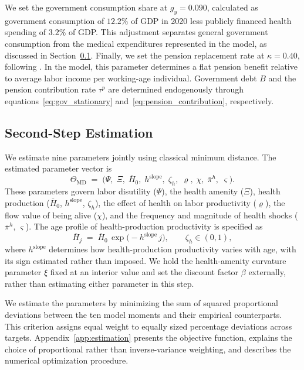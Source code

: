 \documentclass[12pt,a4paper]{article}
\begin{document}
We set the government consumption share at $g_y=0.090$, calculated as government consumption of $12.2\%$ of GDP in 2020 less publicly financed health spending of $3.2\%$ of GDP. This adjustment separates general government consumption from the medical expenditures represented in the model, as discussed in Section~\ref{subsec:secondstep_smm}. Finally, we set the pension replacement rate at $\kappa=0.40$, following \citet{Bonthuis2024}. In the model, this parameter determines a flat pension benefit relative to average labor income per working-age individual. Government debt $B$ and the pension contribution rate $\tau^p$ are determined endogenously through equations~\eqref{eq:gov_stationary} and~\eqref{eq:pension_contribution}, respectively.


\subsection{Second-Step Estimation}
\label{subsec:secondstep_smm}

We estimate nine parameters jointly using classical minimum distance. The estimated parameter vector is
\[
\Theta_{\mathrm{MD}} \;=\; \bigl(\Psi,\; \Xi,\; \overline{H}_0,\; h^{\mathrm{slope}},\; \zeta_h,\; \varrho,\; \chi,\; \bar\pi^h,\; \varsigma\bigr).
\]
These parameters govern labor disutility ($\Psi$), the health amenity ($\Xi$), health production ($\overline{H}_0$, $h^{\mathrm{slope}}$, $\zeta_h$), the effect of health on labor productivity ($\varrho$), the flow value of being alive ($\chi$), and the frequency and magnitude of health shocks ($\bar\pi^h$, $\varsigma$). The age profile of health-production productivity is specified as
\begin{equation}
\label{eq:healthproduction}
\overline{H}_{j} \;=\; \overline{H}_{0}\,\exp\bigl(-h^{\mathrm{slope}}\, j\bigr), \qquad \zeta_h \in (0,1),
\end{equation}
where $h^{\mathrm{slope}}$ determines how health-production productivity varies with age, with its sign estimated rather than imposed. We hold the health-amenity curvature parameter $\xi$ fixed at an interior value and set the discount factor $\beta$ externally, rather than estimating either parameter in this step.

We estimate the parameters by minimizing the sum of squared proportional deviations between the ten model moments and their empirical counterparts. This criterion assigns equal weight to equally sized percentage deviations across targets. Appendix~\ref{app:estimation} presents the objective function, explains the choice of proportional rather than inverse-variance weighting, and describes the numerical optimization procedure.
\end{document}
